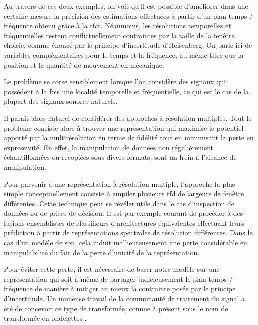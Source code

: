 Au travers de ces deux exemples, on voit qu'il est possible d'améliorer dans une certaine mesure la précision des estimations effectuées à partir d'un plan temps / fréquence obtenu grâce à la tfct. Néanmoins, les résolutions temporelles et fréquentielles restent conflictuellement contraintes par la taille de la fenêtre choisie, comme énoncé par le principe d'incertitude d'Heisenberg. On parle ici de variables complémentaires pour le temps et la fréquence, au même titre que la position et la quantité de mouvement en mécanique.

Le problème se corse sensiblement lorsque l'on considère des signaux qui possèdent à la fois une localité temporelle et fréquentielle, ce qui est le cas de la plupart des signaux sonores naturels.

Il paraît alors naturel de considérer des approches à résolution multiples. Tout le problème consiste alors à trouver une représentation qui maximise le potentiel apporté par la multirésolution en terme de fidélité tout en minimisant la perte en expressivité. En effet, la manipulation de données non régulièrement échantillonnées ou recopiées sous divers formats, sont un frein à l'aisance de manipulation.


Pour parvenir à une représentation à résolution multiple, l'approche la plus simple conceptuellement consiste à \og empiler \fg plusieurs tfd de largeurs de fenêtre différentes. Cette technique peut se révéler utile dans le cas d'inspection de données ou de prises de décision. Il est par exemple courant de procéder à des fusions ensemblistes de classifieurs d'architectures équivalentes effectuant leurs prédiction à partir de représentations spectrales de résolution différentes. Dans le cas d'un modèle de son, cela induit malheureusement une perte considérable en manipulabilité du fait de la perte d'unicité de la représentation.

Pour éviter cette perte, il est nécessaire de baser notre modèle sur une représentation qui soit à même de partager judicieusement le plan temps / fréquence de manière à mitiger au mieux la contrainte posée par le principe d'incertitude. Un immense travail de la communauté de traitement du signal a été de concevoir ce type de transformée, connue à présent sous le nom de transformée en \og ondelettes \fg.~\cite{mallat1989theory}



